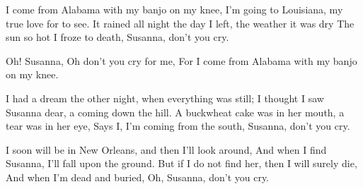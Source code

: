 \beginverse
I come from Alabama with my banjo on my knee, 
I'm going to Louisiana, my true love for to see. 
It rained all night the day I left, the weather it was dry 
The sun so hot I froze to death, Susanna, don't you cry.
\endverse

\beginchorus
Oh! Susanna, Oh don't you cry for me, 
For I come from Alabama with my banjo on my knee.
\endchorus

\beginchorus
I had a dream the other night, when everything was still; 
I thought I saw Susanna dear, a coming down the hill. 
A buckwheat cake was in her mouth, a tear was in her eye, 
Says I, I'm coming from the south, Susanna, don't you cry.
\endchorus

\beginchorus
I soon will be in New Orleans, and then I'll look around, 
And when I find Susanna, I'll fall upon the ground. 
But if I do not find her, then I will surely die, 
And when I'm dead and buried, Oh, Susanna, don't you cry.
\endchorus
\endsong
